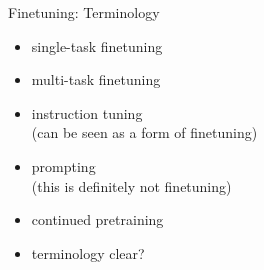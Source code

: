 \begin{frame}{Finetuning: Terminology}

\vfill

\begin{itemize}
\item single-task finetuning
\item multi-task finetuning
\item instruction tuning\\ (can be seen as a form of finetuning)
\item prompting\\
(this is definitely not finetuning)
\item continued pretraining
\item \ques terminology clear?
\end{itemize}

\vfill

\end{frame}





%
%	
%
%


%
%
%
%

